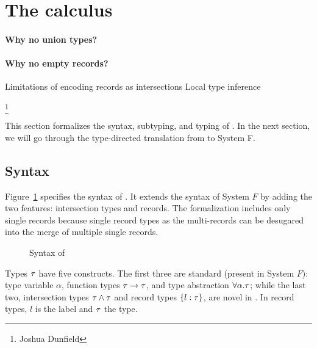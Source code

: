 \section{The \name calculus}

\paragraph{Why no union types?}

\paragraph{Why no empty records?}

Limitations of encoding records as intersections
Local type inference


\footnote{Joshua Dunfield}

This section formalizes the syntax, subtyping, and typing of \name. In the next
section, we will go through the type-directed translation from \name to System
F.


\subsection{Syntax}

Figure~\ref{fig:fi-syntax} specifies the syntax of \name. It extends the syntax
of System $ F $ by adding the two features: intersection types and records. The
formalization includes only single records because single record types as the
multi-records can be desugared into the merge of multiple single records.

\begin{figure}
  
  \caption{Syntax of \name}
  \label{fig:fi-syntax}
\end{figure}

Types $ \tau $ have five constructs. The first three are standard (present in
System $ F $): type variable $ \alpha $, function types $ \tau \to \tau $, and type
abstraction $ \forall \alpha. \tau $; while the last two, intersection types
$ \tau \wedge \tau $ and record types $ \{ l : \tau \} $, are novel in \name. In
record types, $ l $ is the label and $ \tau $ the type.

